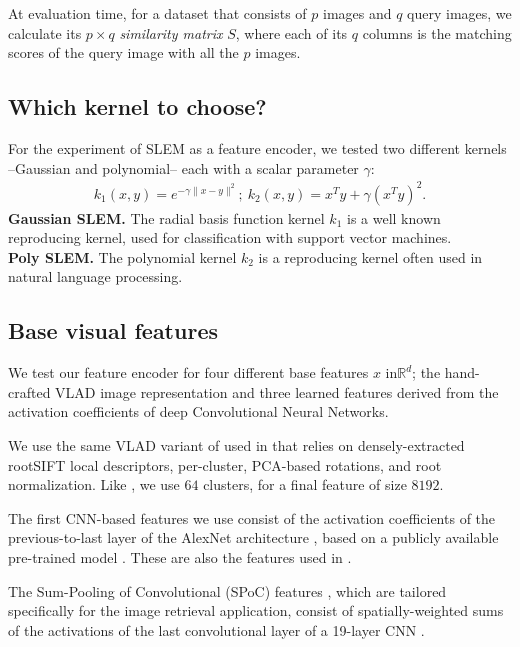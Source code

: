 At evaluation time, for a dataset that consists of $p$ images and $q$ query images, we calculate its $p\times q$ \emph{similarity matrix} $S$, where each of its $q$ columns is the matching scores of the query image with all the $p$ images. 


\subsection{Which kernel to choose?}
For the experiment of SLEM as a feature encoder, we tested two different kernels --Gaussian and polynomial-- each with a scalar parameter $\gamma$:
\begin{align}
    k_1(x,y) = e^{-\gamma\|x-y \|^2}; \ 
    k_2(x,y) = x^Ty+\gamma(x^Ty)^2. \label{kernels}
\end{align}
\textbf{Gaussian SLEM.} The radial basis function kernel $k_1$ is a
well known reproducing kernel, used for classification with support vector machines.\\
\textbf{Poly SLEM.} The polynomial kernel $k_2$ is a reproducing kernel often used in natural language processing.


\subsection{Base visual features}
We test our feature encoder for four different base features $x$ in$\mathbb{R}^d$; the hand-crafted VLAD image representation and three learned features derived from the activation coefficients of deep Convolutional Neural Networks.

We use the same VLAD variant of \cite{Delhumeau2013} used in \cite{ZePe15} that relies on densely-extracted rootSIFT \cite{3things} local descriptors, per-cluster, PCA-based rotations, and root normalization. Like \cite{ZePe15}, we use $64$ clusters, for a final feature of size $8192$.

The first CNN-based features we use consist of the activation coefficients of the previous-to-last layer of the AlexNet architecture \cite{Krizhevsky2012}, based on a publicly available pre-trained model \cite{jia2014caffe}. These are also the features used in \cite{ZePe15}.

The Sum-Pooling of Convolutional (SPoC) features \cite{babenko15}, which are tailored specifically for the image retrieval application, consist of spatially-weighted sums of the activations of the last convolutional layer of a 19-layer CNN \cite{SimonZisser15}.

